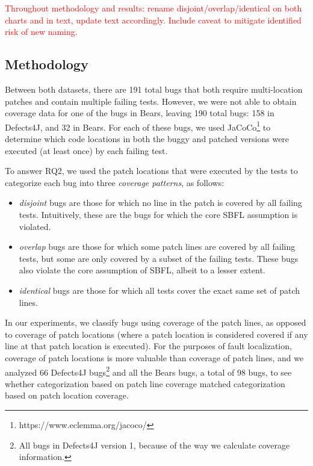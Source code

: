 \documentclass[10pt, conference]{IEEEtran}
\newcommand\todo[1]{\textcolor{red}{#1}}
\begin{document}

\todo{Throughout methodology and results: rename disjoint/overlap/identical on
  both charts and in text, update text accordingly.  Include caveat to mitigate
  identified risk of new naming.}

\subsection{Methodology}

Between both datasets, there are 191 total bugs that both require multi-location
patches and contain multiple failing tests. However, we were not able to obtain coverage 
data for one of the bugs in Bears, leaving 190 total bugs: 158 in Defects4J, and 32 in
Bears. 
For each of these bugs, we used JaCoCo\footnote{https://www.eclemma.org/jacoco/}
to determine which code locations in both the buggy and patched versions were executed
(at least once) by each failing test.

To answer RQ2, we used the patch locations that were executed by the tests to categorize 
each bug into three \emph{coverage patterns}, as follows:
\begin{itemize}
\item \emph{disjoint} bugs are those for which no line in the patch is covered by all
failing tests.  Intuitively, these are the bugs for which the core SBFL
assumption is violated.
\item \emph{overlap} bugs are those for which some patch lines are covered
by all failing tests, but some are only covered by a subset of the failing
tests. These bugs also violate the core assumption of SBFL, albeit to a lesser
extent.
\item \emph{identical} bugs are those for which all tests cover the exact same
  set of patch lines.
\end{itemize}

In our experiments, we classify bugs using coverage of the patch lines, as opposed to 
coverage of 
patch locations (where a patch location is considered covered if any line at that patch location 
is 
executed). For the purposes of fault localization, coverage of patch locations is more valuable 
than coverage of patch lines, and we analyzed 66 Defects4J bugs\footnote{All 
bugs in Defects4J version 1, because of the way we calculate coverage information.}
 and all the Bears bugs, a total of 98 bugs, to see whether categorization 
based on patch line 
coverage matched categorization based on patch location coverage.
\end{document}
